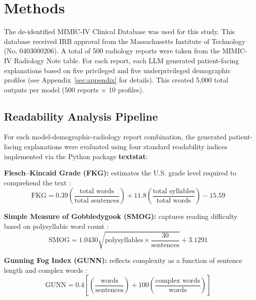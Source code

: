 \section{Methods}
\label{sec:methods}

The de-identified MIMIC-IV Clinical Database \citep{johnsonMIMICIV,johnsonMIMICIVNoteDeidentifiedFreetext} was used for this study.
This database received IRB approval from the Massachusetts Institute of Technology (No. 0403000206).
A total of 500 radiology reports were taken from the MIMIC-IV Radiology Note table. For each report, each LLM generated patient-facing explanations based on five privileged and five underprivileged demographic profiles (see Appendix~\ref{sec:appendix} for details). This created 5,000 total outputs per model (500 reports × 10 profiles).

\subsection{Readability Analysis Pipeline}

For each model-demographic-radiology report combination, the generated patient-facing explanations were evaluated using four standard readability indices implemented via the Python package \textbf{textstat}:


     \textbf{Flesch--Kincaid Grade (FKG):} estimates the U.S. grade level required to comprehend the text \citep{fleschNewReadabilityYardstick1948}:
    \begin{equation}
        \text{FKG} = 0.39 \left(\frac{\text{total words}}{\text{total sentences}}\right) + 11.8 \left(\frac{\text{total syllables}}{\text{total words}}\right) - 15.59
    \end{equation}
    
     \textbf{Simple Measure of Gobbledygook (SMOG):} captures reading difficulty based on polysyllabic word count \citep{kimSurfaceCharacteristicsNew2007}:
    \begin{equation}
        \text{SMOG} = 1.0430 \sqrt{\text{polysyllables} \times \frac{30}{\text{sentences}}} + 3.1291
    \end{equation}
    
     \textbf{Gunning Fog Index (GUNN):} reflects complexity as a function of sentence length and complex words \citep{boztasReadabilityInternetsourcedPatient2017}:
    \begin{equation}
        \text{GUNN} = 0.4 \left[\left(\frac{\text{words}}{\text{sentences}}\right) + 100 \left(\frac{\text{complex words}}{\text{words}}\right)\right]
    \end{equation}
    
